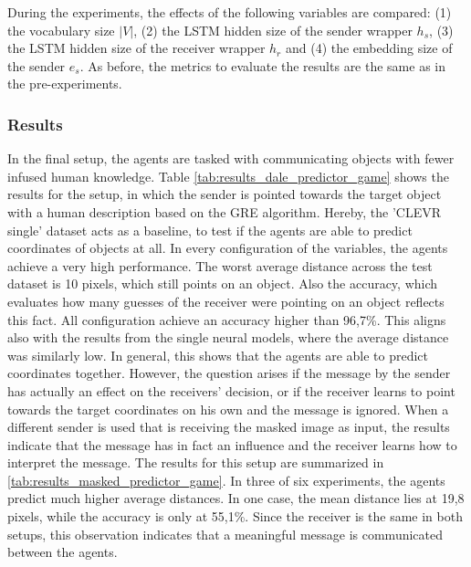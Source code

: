 During the experiments, the effects of the following variables are compared:
(1) the vocabulary size $|V|$,
(2) the LSTM hidden size of the sender wrapper $h_s$,
(3) the LSTM hidden size of the receiver wrapper $h_r$ and
(4) the embedding size of the sender $e_s$.
As before, the metrics to evaluate the results are the same as in the pre-experiments.

\subsubsection*{Results}
In the final setup, the agents are tasked with communicating objects with fewer infused human knowledge.
Table \ref{tab:results_dale_predictor_game} shows the results for the setup, in which the sender is pointed towards the target object with a human description based on the GRE algorithm.
Hereby, the 'CLEVR single' dataset acts as a baseline, to test if the agents are able to predict coordinates of objects at all.
In every configuration of the variables, the agents achieve a very high performance.
The worst average distance across the test dataset is 10 pixels, which still points on an object.
Also the accuracy, which evaluates how many guesses of the receiver were pointing on an object reflects this fact.
All configuration achieve an accuracy higher than 96,7\%.
This aligns also with the results from the single neural models, where the average distance was similarly low.
In general, this shows that the agents are able to predict coordinates together.
However, the question arises if the message by the sender has actually an effect on the receivers' decision, or if the receiver learns to point towards the target coordinates on his own and the message is ignored.
When a different sender is used that is receiving the masked image as input, the results indicate that the message has in fact an influence and the receiver learns how to interpret the message.
The results for this setup are summarized in \ref{tab:results_masked_predictor_game}.
In three of six experiments, the agents predict much higher average distances.
In one case, the mean distance lies at 19,8 pixels, while the accuracy is only at 55,1\%.
Since the receiver is the same in both setups, this observation indicates that a meaningful message is communicated between the agents.


